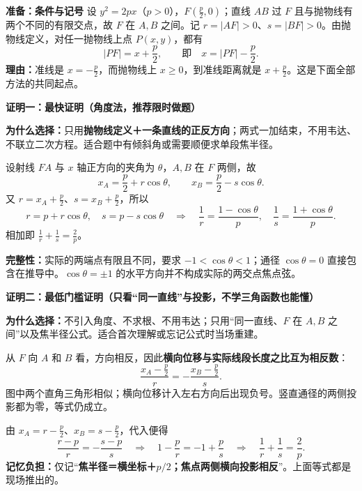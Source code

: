 \clearpage
\begin{proofbox}
\textbf{\textcolor{CProof}{准备：条件与记号}}
设 $y^2=2px$（$p>0$），$F(\frac p2,0)$；直线 $AB$ 过 $F$ 且与抛物线有两个不同的有限交点，故 $F$ 在 $A,B$ 之间。记 $r=|AF|>0$、$s=|BF|>0$。由抛物线定义，对任一抛物线上点 $P(x,y)$，都有
\[
 \boxed{|PF|=x+\frac p2},\qquad
 \text{即}\quad x=|PF|-\frac p2.
\]
\textbf{理由：}准线是 $x=-\frac p2$，而抛物线上 $x\ge0$，到准线距离就是 $x+\frac p2$。这是下面全部方法的共同起点。

\end{proofbox}
\clearpage
\begin{proofbox}
\textbf{\textcolor{CProof}{证明一：最快证明（角度法，推荐限时做题）}}

\textbf{为什么选择：}只用\textbf{抛物线定义＋一条直线的正反方向}；两式一加结束，不用韦达、不联立二次方程。适合题中有倾斜角或需要顺便求单段焦半径。

\begin{center}\end{center}

设射线 $FA$ 与 $x$ 轴正方向的夹角为 $\theta$，$A,B$ 在 $F$ 两侧，故
\[
 x_A=\frac p2+r\cos\theta,\qquad
 x_B=\frac p2-s\cos\theta.
\]
又 $r=x_A+\frac p2$、$s=x_B+\frac p2$，所以
\[
 r=p+r\cos\theta,\quad s=p-s\cos\theta
 \quad\Longrightarrow\quad
 \boxed{\frac1r=\frac{1-\cos\theta}{p}},\quad
 \boxed{\frac1s=\frac{1+\cos\theta}{p}}.
\]
相加即 $\boxed{\frac1r+\frac1s=\frac2p}$。

\textbf{完整性：}实际的两端点有限且不同，要求 $-1<\cos\theta<1$；通径 $\cos\theta=0$ 直接包含在推导中。$\cos\theta=\pm1$ 的水平方向并不构成实际的两交点焦点弦。

\bigskip
\end{proofbox}
\clearpage
\begin{proofbox}
\textbf{\textcolor{CProof}{证明二：最低门槛证明（只看“同一直线”与投影，不学三角函数也能懂）}}

\textbf{为什么选择：}不引入角度、不求根、不用韦达；只用“同一直线、$F$ 在 $A,B$ 之间”以及焦半径公式。适合首次理解或忘记公式时当场重建。

\begin{center}\end{center}

从 $F$ 向 $A$ 和 $B$ 看，方向相反，因此\textbf{横向位移与实际线段长度之比互为相反数}：
\[
 \frac{x_A-\frac p2}{r}=-\frac{x_B-\frac p2}{s}.
\]
图中两个直角三角形相似；横向位移计入左右方向后出现负号。竖直通径的两侧投影都为零，等式仍成立。

由 $x_A=r-\frac p2$、$x_B=s-\frac p2$，代入便得
\[
 \frac{r-p}{r}=-\frac{s-p}{s}
 \quad\Longrightarrow\quad
 1-\frac p r=-1+\frac p s
 \quad\Longrightarrow\quad
 \boxed{\frac1r+\frac1s=\frac2p}.
\]
\textbf{记忆负担：}仅记“\textbf{焦半径＝横坐标＋$p/2$；焦点两侧横向投影相反}”。上面等式都是现场推出的。

\bigskip
\end{proofbox}
